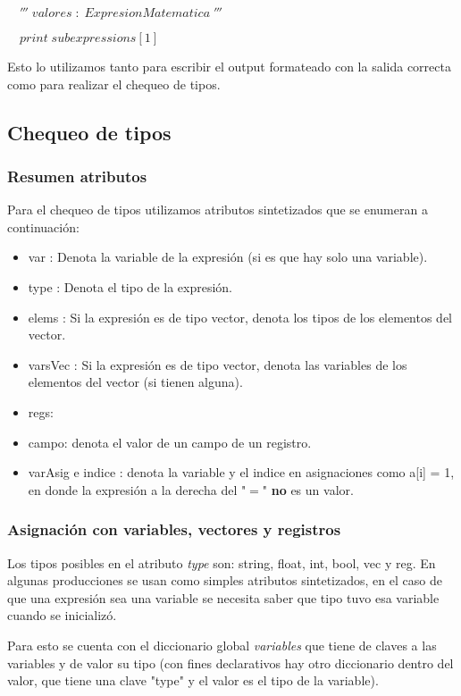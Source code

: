 $\quad'''\; valores\; :\; ExpresionMatematica\;'''$

$\quad print\; subexpressions[1]$


Esto lo utilizamos tanto para escribir el output formateado con la salida correcta como para realizar el chequeo de tipos.

\subsection{Chequeo de tipos}

\subsubsection{Resumen atributos}

Para el chequeo de tipos utilizamos atributos sintetizados que se enumeran a continuación:

\begin{itemize}
\item var : Denota la variable de la expresión (si es que hay solo una variable).
\item type : Denota el tipo de la expresión.
\item elems : Si la expresión es de tipo vector, denota los tipos de los elementos del vector.
\item varsVec : Si la expresión es de tipo vector, denota las variables de los elementos del vector (si tienen alguna).
\item regs:
\item campo: denota el valor de un campo de un registro.
\item varAsig e indice : denota la variable y el indice en asignaciones como a[i] = 1, 
en donde la expresión a la derecha del "$=$" \textbf{no} es un valor.
\end{itemize}

\subsubsection{Asignación con variables, vectores y registros}
Los tipos posibles en el atributo \textit{type} son: string, float, int, bool, vec y reg. En algunas producciones se usan como simples atributos sintetizados, en el caso de que una expresión sea una variable se necesita saber que tipo tuvo esa variable cuando se inicializó. 

Para esto se cuenta con el diccionario global \textit{variables} que tiene de claves a las variables y de valor su tipo (con fines declarativos hay otro diccionario dentro del valor, que tiene una clave "type" y el valor es el tipo de la variable).

